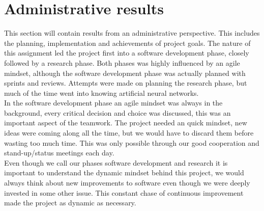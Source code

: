 \section{Administrative results}
This section will contain results from an administrative perspective. This includes the planning, implementation and achievements of project goals.
\quad
The nature of this assignment led the project first into a software development phase, closely followed by a research phase. Both phases was highly influenced by an agile mindset, although the software development phase was actually planned with sprints and reviews. Attempts were made on planning the research phase, but much of the time went into knowing artificial neural networks. \\
In the software development phase an agile mindset was always in the background, every critical decision and choice was discussed, this was an important aspect of the teamwork. The project needed an quick mindset, new ideas were coming along all the time, but we would have to discard them before wasting too much time. This was only possible through our good cooperation and stand-up/status meetings each day. \\
Even though we call our phases software development and research it is important to understand the dynamic mindset behind this project, we would always think about new improvements to software even though we were deeply invested in some other issue. This constant chase of continuous improvement made the project as dynamic as necessary. %


